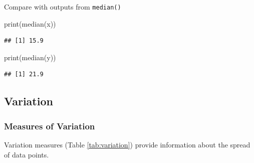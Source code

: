 \documentclass[
]{article}
\newenvironment{Shaded}{\begin{snugshade}}{\end{snugshade}}
\newcommand{\FunctionTok}[1]{\textcolor[rgb]{0.00,0.00,0.00}{#1}}
\newcommand{\NormalTok}[1]{#1}
\begin{document}
Compare with outputs from \texttt{median()}

\begin{Shaded}
\begin{Highlighting}[]
\FunctionTok{print}\NormalTok{(}\FunctionTok{median}\NormalTok{(x))}
\end{Highlighting}
\end{Shaded}

\begin{verbatim}
## [1] 15.9
\end{verbatim}

\begin{Shaded}
\begin{Highlighting}[]
\FunctionTok{print}\NormalTok{(}\FunctionTok{median}\NormalTok{(y))}
\end{Highlighting}
\end{Shaded}

\begin{verbatim}
## [1] 21.9
\end{verbatim}

\hypertarget{variation}{%
\subsection{Variation}\label{variation}}

\hypertarget{measures-of-variation}{%
\subsubsection{Measures of Variation}\label{measures-of-variation}}

Variation measures (Table \ref{tab:variation}) provide information about the spread of data points.
\end{document}
